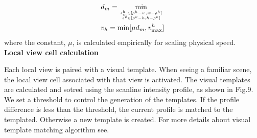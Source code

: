 \begin{equation}
	\begin{aligned}
		& d_m = \min\limits_{s_m^h \in [\rho^h - w, w - \rho^h] \atop s^v \in [ \rho^v - h, h - \rho^v ] } \\
		& v_h = \min [\mu d_m, v_{\max}^h]
	\end{aligned}
\end{equation}
where the constant, $ \mu $, is calculated empirically for scaling physical speed.
\\

\noindent \textbf{Local view cell calculation}

Each local view is paired with a visual template.
When seeing a familiar scene, the local view cell associated with that view is activated.
The visual templates are calculated and sotred using the scanline intensity profile, as shown in Fig.9.
We set a threshold to control the generation of the templates.
If the profile difference is less than the threshold, the current profile is matched to the templated.
Otherwise a new template is created.
For more details about visual template matching algorithm see.






